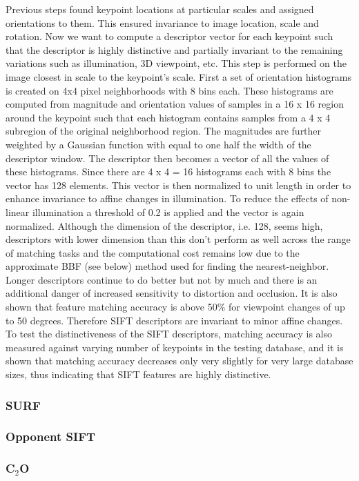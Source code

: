\documentclass[12pt]{article}
\begin{document}
\begin{itemize}
Previous steps found keypoint locations at particular scales and assigned orientations to them. This ensured invariance to image location, scale and rotation. Now we want to compute a descriptor vector for each keypoint such that the descriptor is highly distinctive and partially invariant to the remaining variations such as illumination, 3D viewpoint, etc. This step is performed on the image closest in scale to the keypoint's scale.
First a set of orientation histograms is created on 4x4 pixel neighborhoods with 8 bins each. These histograms are computed from magnitude and orientation values of samples in a 16 x 16 region around the keypoint such that each histogram contains samples from a 4 x 4 subregion of the original neighborhood region. The magnitudes are further weighted by a Gaussian function with   equal to one half the width of the descriptor window. The descriptor then becomes a vector of all the values of these histograms. Since there are 4 x 4 = 16 histograms each with 8 bins the vector has 128 elements. This vector is then normalized to unit length in order to enhance invariance to affine changes in illumination. To reduce the effects of non-linear illumination a threshold of 0.2 is applied and the vector is again normalized.
Although the dimension of the descriptor, i.e. 128, seems high, descriptors with lower dimension than this don't perform as well across the range of matching tasks and the computational cost remains low due to the approximate BBF (see below) method used for finding the nearest-neighbor. Longer descriptors continue to do better but not by much and there is an additional danger of increased sensitivity to distortion and occlusion. It is also shown that feature matching accuracy is above 50\% for viewpoint changes of up to 50 degrees. Therefore SIFT descriptors are invariant to minor affine changes. To test the distinctiveness of the SIFT descriptors, matching accuracy is also measured against varying number of keypoints in the testing database, and it is shown that matching accuracy decreases only very slightly for very large database sizes, thus indicating that SIFT features are highly distinctive.
	
	
	
	
\end{itemize}
\subsubsection{SURF}

\subsubsection{Opponent SIFT}

\subsubsection{C$_2$O}

\end{document}
